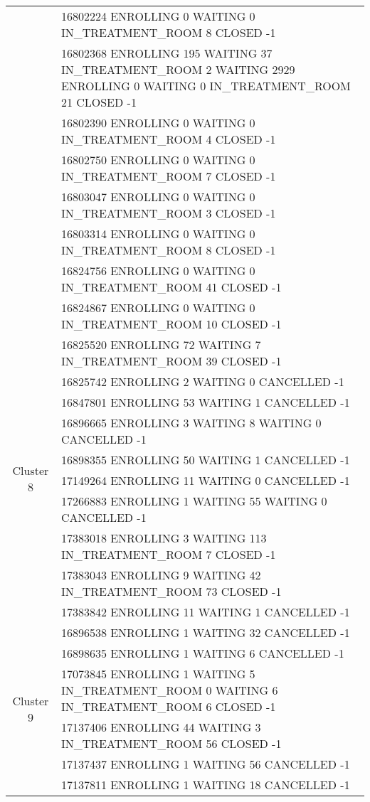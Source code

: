 {\begin{longtable}{|c|p{}|}
		& 16802224 ENROLLING 0 WAITING 0 IN\_TREATMENT\_ROOM 8 CLOSED -1 \\
		& 16802368 ENROLLING 195 WAITING 37 IN\_TREATMENT\_ROOM 2 WAITING 2929 ENROLLING 0 WAITING 0 IN\_TREATMENT\_ROOM 21 CLOSED -1 \\
		& 16802390 ENROLLING 0 WAITING 0 IN\_TREATMENT\_ROOM 4 CLOSED -1 \\
		& 16802750 ENROLLING 0 WAITING 0 IN\_TREATMENT\_ROOM 7 CLOSED -1 \\
		& 16803047 ENROLLING 0 WAITING 0 IN\_TREATMENT\_ROOM 3 CLOSED -1 \\
		& 16803314 ENROLLING 0 WAITING 0 IN\_TREATMENT\_ROOM 8 CLOSED -1 \\
		& 16824756 ENROLLING 0 WAITING 0 IN\_TREATMENT\_ROOM 41 CLOSED -1 \\
		& 16824867 ENROLLING 0 WAITING 0 IN\_TREATMENT\_ROOM 10 CLOSED -1 \\
		\hline
		\multirow{10}{*}{Cluster 8}
		& 16825520 ENROLLING 72 WAITING 7 IN\_TREATMENT\_ROOM 39 CLOSED -1 \\
		& 16825742 ENROLLING 2 WAITING 0 CANCELLED -1 \\
		& 16847801 ENROLLING 53 WAITING 1 CANCELLED -1 \\
		& 16896665 ENROLLING 3 WAITING 8 WAITING 0 CANCELLED -1 \\
		& 16898355 ENROLLING 50 WAITING 1 CANCELLED -1 \\
		& 17149264 ENROLLING 11 WAITING 0 CANCELLED -1 \\
		& 17266883 ENROLLING 1 WAITING 55 WAITING 0 CANCELLED -1 \\
		& 17383018 ENROLLING 3 WAITING 113 IN\_TREATMENT\_ROOM 7 CLOSED -1 \\
		& 17383043 ENROLLING 9 WAITING 42 IN\_TREATMENT\_ROOM 73 CLOSED -1 \\
		& 17383842 ENROLLING 11 WAITING 1 CANCELLED -1 \\
		\hline
		\multirow{10}{*}{Cluster 9}
		& 16896538 ENROLLING 1 WAITING 32 CANCELLED -1 \\
		& 16898635 ENROLLING 1 WAITING 6 CANCELLED -1 \\
		& 17073845 ENROLLING 1 WAITING 5 IN\_TREATMENT\_ROOM 0 WAITING 6 IN\_TREATMENT\_ROOM 6 CLOSED -1 \\
		& 17137406 ENROLLING 44 WAITING 3 IN\_TREATMENT\_ROOM 56 CLOSED -1 \\
		& 17137437 ENROLLING 1 WAITING 56 CANCELLED -1 \\
		& 17137811 ENROLLING 1 WAITING 18 CANCELLED -1 \\

\end{longtable}}
